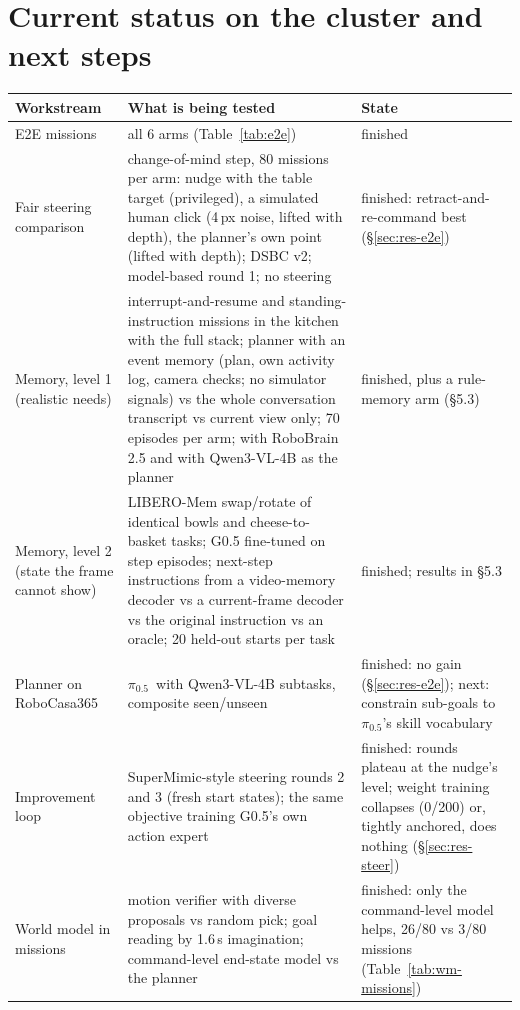 \documentclass[10pt,a4paper]{article}
\newcommand{\pzf}{$\pi_{0.5}$}
\begin{document}
\clearpage
\section{Current status on the cluster and next steps}
\label{sec:status}
\begin{small}
\begin{xltabular}{\textwidth}{>{\raggedright\arraybackslash}p{3.1cm}YY}
\toprule
Workstream & What is being tested & State \\
\midrule
\endhead
E2E missions & all 6 arms (Table~\ref{tab:e2e}) & finished \\
Fair steering comparison & change-of-mind step, 80 missions per arm: nudge with the table target (privileged), a simulated human click (4\,px noise, lifted with depth), the planner's own point (lifted with depth); DSBC v2; model-based round 1; no steering & finished: retract-and-re-command best (\S\ref{sec:res-e2e}) \\
Memory, level 1 (realistic needs) & interrupt-and-resume and standing-instruction missions in the kitchen with the full stack; planner with an event memory (plan, own activity log, camera checks; no simulator signals) vs the whole conversation transcript vs current view only; 70 episodes per arm; with RoboBrain 2.5 and with Qwen3-VL-4B as the planner & finished, plus a rule-memory arm (\S5.3) \\
Memory, level 2 (state the frame cannot show) & LIBERO-Mem swap/rotate of identical bowls and cheese-to-basket tasks; G0.5 fine-tuned on step episodes; next-step instructions from a video-memory decoder vs a current-frame decoder vs the original instruction vs an oracle; 20 held-out starts per task & finished; results in \S5.3 \\
Planner on RoboCasa365 & \pzf\ with Qwen3-VL-4B subtasks, composite seen/unseen & finished: no gain (\S\ref{sec:res-e2e}); next: constrain sub-goals to \pzf's skill vocabulary \\
Improvement loop & SuperMimic-style steering rounds 2 and 3 (fresh start states); the same objective training G0.5's own action expert & finished: rounds plateau at the nudge's level; weight training collapses (0/200) or, tightly anchored, does nothing (\S\ref{sec:res-steer}) \\
World model in missions & motion verifier with diverse proposals vs random pick; goal reading by 1.6\,s imagination; command-level end-state model vs the planner & finished: only the command-level model helps, 26/80 vs 3/80 missions (Table~\ref{tab:wm-missions}) \\

\end{xltabular}
\end{small}
\end{document}
